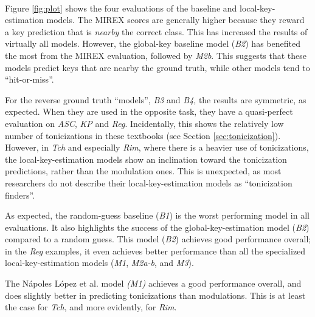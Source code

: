 ~\label{sec:res}

Figure \ref{fig:plot} shows the four evaluations of the
baseline and local-key-estimation models. The MIREX scores
are generally higher because they reward a key prediction
that is \emph{nearby} the correct class. This has increased
the results of virtually all models. However, the global-key
baseline model (\emph{B2}) has benefited the most from the
MIREX evaluation, followed by \emph{M2b}. This suggests that
these models predict keys that are nearby the ground truth,
while other models tend to ``hit-or-miss''.

For the reverse ground truth ``models'', \emph{B3} and
\emph{B4}, the results are symmetric, as expected. When they
are used in the opposite task, they have a quasi-perfect
evaluation on \emph{ASC}, \emph{KP} and \emph{Reg}.
Incidentally, this shows the relatively low number of
tonicizations in these textbooks (see Section
\ref{sec:tonicization}). However, in \emph{Tch} and
especially \emph{Rim}, where there is a heavier use of
tonicizations, the local-key-estimation models show an
inclination toward the tonicization predictions, rather than
the modulation ones. This is unexpected, as most researchers
do not describe their local-key-estimation models as
``tonicization finders''.

As expected, the random-guess baseline (\emph{B1}) is the
worst performing model in all evaluations. It also
highlights the success of the global-key-estimation model
(\emph{B2}) compared to a random guess. This model
(\emph{B2}) achieves good performance overall; in the
\emph{Reg} examples, it even achieves better performance
than all the specialized local-key-estimation models
(\emph{M1}, \emph{M2a-b}, and \emph{M3}).


The N\'apoles L\'opez et al. model \emph{(M1)} achieves a
good performance overall, and does slightly better in
predicting tonicizations than modulations. This is at least
the case for \emph{Tch}, and more evidently, for \emph{Rim}.



